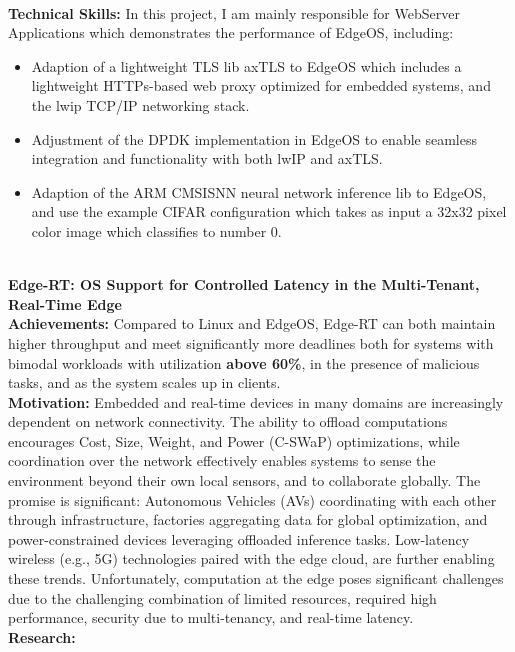 \vspace{-1.0em}
\
\\
\textbf{\small Technical Skills:}
In this project, I am mainly responsible for WebServer Applications which demonstrates the performance of EdgeOS, including:
\begin{itemize}[leftmargin=*]
    \setlength\itemsep{-0.0em}
	\item Adaption of a lightweight TLS lib axTLS to EdgeOS which includes a lightweight HTTPs-based web proxy optimized for embedded systems, and the lwip TCP/IP networking stack.
	\item Adjustment of  the DPDK implementation in EdgeOS to enable seamless integration and functionality with both lwIP and axTLS.
	\item Adaption of the ARM CMSISNN neural network inference lib to EdgeOS, and use the example CIFAR\-10 configuration which takes as input a 32x32 pixel color image which classifies to number 0.
\end{itemize}
\vspace{-1.0em}
\
\\
\textbf{Edge-RT: OS Support for Controlled Latency in the Multi-Tenant, Real-Time Edge}
\\
\textbf{\small Achievements:}
Compared to Linux and EdgeOS, Edge-RT can both maintain higher throughput and meet significantly more deadlines both for systems with bimodal workloads with utilization \textbf{above 60\%}, in the presence of malicious tasks, and as the system scales up in clients.
\\
\textbf{\small Motivation:}
Embedded and real-time devices in many domains are increasingly dependent on network connectivity.
The ability to offload computations encourages Cost, Size, Weight, and Power (C-SWaP) optimizations, while coordination over the network effectively enables systems to sense the environment beyond their own local sensors, and to collaborate globally.
The promise is significant: Autonomous Vehicles (AVs) coordinating with each other through infrastructure, factories aggregating data for global optimization, and power-constrained devices leveraging offloaded inference tasks.
Low-latency wireless (e.g., 5G) technologies paired with the edge cloud, are further enabling these trends.
Unfortunately, computation at the edge poses significant challenges due to the challenging combination of limited resources, required high performance, security due to multi-tenancy, and real-time latency.
\\
\textbf{\small Research:}
